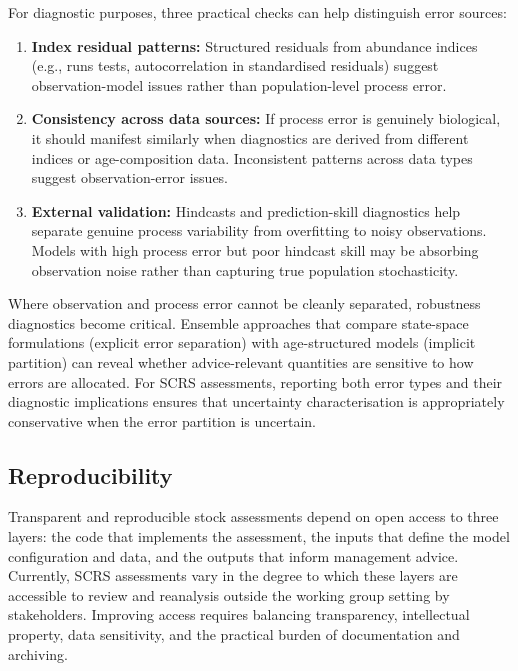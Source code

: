 \documentclass[11pt,a4paper]{article}
\begin{document}
For diagnostic purposes, three practical checks can help distinguish error sources:

\begin{enumerate}
  \item \textbf{Index residual patterns:} Structured residuals from abundance indices (e.g., runs tests, autocorrelation in standardised residuals) suggest observation-model issues rather than population-level process error.

  \item \textbf{Consistency across data sources:} If process error is genuinely biological, it should manifest similarly when diagnostics are derived from different indices or age-composition data. Inconsistent patterns across data types suggest observation-error issues.

  \item \textbf{External validation:} Hindcasts and prediction-skill diagnostics help separate genuine process variability from overfitting to noisy observations. Models with high process error but poor hindcast skill may be absorbing observation noise rather than capturing true population stochasticity.
\end{enumerate}

Where observation and process error cannot be cleanly separated, robustness diagnostics become critical. Ensemble approaches that compare state-space formulations (explicit error separation) with age-structured models (implicit partition) can reveal whether advice-relevant quantities are sensitive to how errors are allocated. For SCRS assessments, reporting both error types and their diagnostic implications ensures that uncertainty characterisation is appropriately conservative when the error partition is uncertain.

\subsection{Reproducibility}

Transparent and reproducible stock assessments depend on open access to three layers: the code that implements the assessment, the inputs that define the model configuration and data, and the outputs that inform management advice. Currently, SCRS assessments vary in the degree to which these layers are accessible to review and reanalysis outside the working group setting by stakeholders. Improving access requires balancing transparency, intellectual property, data sensitivity, and the practical burden of documentation and archiving.
\end{document}
